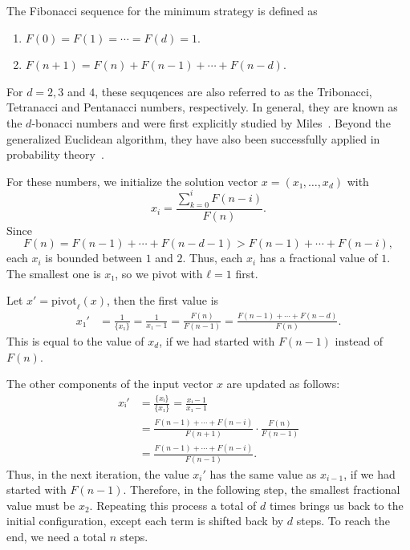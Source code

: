 \begin{definition}
  The Fibonacci sequence for the minimum strategy is defined as
  \begin{enumerate}
    \item $F(0) = F(1) = ⋯ = F(d) = 1$.
    \item $F(n + 1) = F(n) + F(n - 1) + ⋯ + F(n - d)$.
  \end{enumerate}
\end{definition}

For $d = 2, 3$ and $4$, these sequqences are also referred to as the
Tribonacci, Tetranacci and Pentanacci numbers, respectively.
In general, they are known as the $d$-bonacci numbers
and were first explicitly studied by Miles~\cite{Miles60}.
Beyond the generalized Euclidean algorithm,
they have also been successfully applied in probability theory~\cite{Philippou82,Raab63,Schlegel94}.

For these numbers, we initialize the solution vector $x = (x₁, …, x_d)$ with
\[
  x_i = \frac{\sum_{k=0}^i F(n - i)}{F(n)}.
\]
Since
\[
  F(n) = F(n - 1) + ⋯ + F(n - d - 1) > F(n - 1) + ⋯ + F(n - i),
\]
each $x_i$ is bounded between $1$ and $2$.
Thus, each $x_i$ has a fractional value of $1$.
The smallest one is $x₁$, so we pivot with $ℓ = 1$ first.

Let $x' = \mathrm{pivot}_ℓ(x)$, then the first value is
\begin{align*}
  x₁' &
  = \frac{1}{\{x₁\}}
  = \frac{1}{x₁ - 1}
  = \frac{F(n)}{F(n - 1)}
  = \frac{F(n - 1) + ⋯ + F(n - d)}{F(n)}.
\end{align*}
This is equal to the value of $x_d$, if we had started with $F(n-1)$ instead of $F(n)$.

The other components of the input vector $x$ are updated as follows:
\begin{align*}
  xᵢ'
  & = \frac{\{xᵢ\}}{\{x₁\}} = \frac{xᵢ - 1}{x₁ - 1} \\
  & = \frac{F(n - 1) + ⋯ + F(n - i)}{F(n + 1)} · \frac{F(n)}{F(n - 1)} \\
  & = \frac{F(n - 1) + ⋯ + F(n - i)}{F(n - 1)}.
\end{align*}
Thus, in the next iteration, the value $x_i'$ has the same value as $x_{i-1}$,
if we had started with $F(n - 1)$.
Therefore, in the following step, the smallest fractional value must be $x_2$.
Repeating this process a total of $d$ times brings us back to the initial
configuration, except each term is shifted back by $d$ steps.
To reach the end, we need a total $n$ steps.

